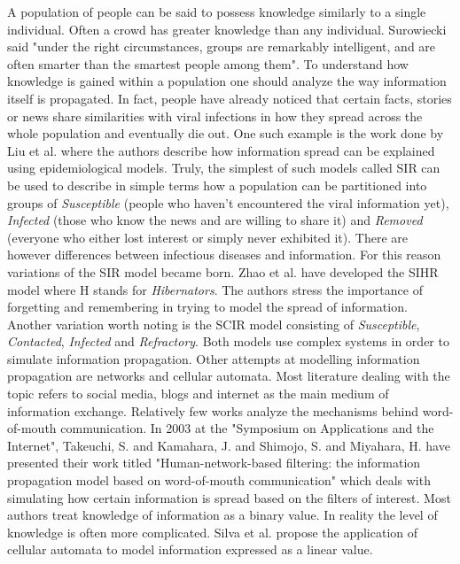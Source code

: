 A population of people can be said to possess knowledge similarly to a single individual.
Often a crowd has greater knowledge than any individual.
Surowiecki said "under the right circumstances, groups are remarkably intelligent, and are often smarter than the smartest people among them"\cite{surowiecki2005wisdom}.
To understand how knowledge is gained within a population one should analyze the way information itself is propagated.
In fact, people have already noticed that certain facts, stories or news share similarities with viral infections in how they spread across the whole population and eventually die out.
One such example is the work done by Liu et al.\cite{liu2016} where the authors describe how information spread can be explained using epidemiological models.
Truly, the simplest of such models called SIR\cite{weiss2013sir} can be used to describe in simple terms how a population can be partitioned into groups of \emph{Susceptible} (people who haven't encountered the viral information yet), \emph{Infected} (those who know the news and are willing to share it) and \emph{Removed} (everyone who either lost interest or simply never exhibited it).
There are however differences between infectious diseases and information.
For this reason variations of the SIR model became born.
Zhao et al.\cite{zhao2012sihr} have developed the SIHR model where H stands for \emph{Hibernators}.
The authors stress the importance of forgetting and remembering in trying to model the spread of information.
Another variation worth noting is the SCIR model consisting of \emph{Susceptible}, \emph{Contacted}, \emph{Infected} and \emph{Refractory}\cite{xiong2012scir}.
Both models use complex systems in order to simulate information propagation.
Other attempts at modelling information propagation are networks\cite{rodriguez2013} and cellular automata\cite{silva2020}.
Most literature dealing with the topic refers to social media, blogs and internet as the main medium of information exchange.
Relatively few works analyze the mechanisms behind word-of-mouth communication.
In 2003 at the "Symposium on Applications and the Internet", Takeuchi, S. and Kamahara, J. and Shimojo, S. and Miyahara, H. have presented their work titled "Human-network-based filtering: the information propagation model based on word-of-mouth communication" which deals with simulating how certain information is spread based on the filters of interest\cite{takeuchi1183031}.
Most authors treat knowledge of information as a binary value.
In reality the level of knowledge is often more complicated.
Silva et al.\cite{silva2020} propose the application of cellular automata to model information expressed as a linear value.

